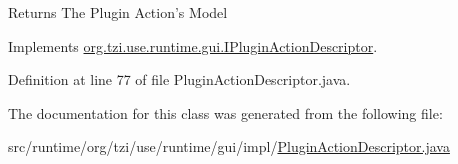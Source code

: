 \begin{DoxyReturn}{Returns}
The Plugin Action's Model 
\end{DoxyReturn}


Implements \hyperlink{interfaceorg_1_1tzi_1_1use_1_1runtime_1_1gui_1_1_i_plugin_action_descriptor_a44045feb006ff19ce6f61a0dc5e8f6e3}{org.\-tzi.\-use.\-runtime.\-gui.\-I\-Plugin\-Action\-Descriptor}.



Definition at line 77 of file Plugin\-Action\-Descriptor.\-java.



The documentation for this class was generated from the following file\-:\begin{DoxyCompactItemize}
\item 
src/runtime/org/tzi/use/runtime/gui/impl/\hyperlink{_plugin_action_descriptor_8java}{Plugin\-Action\-Descriptor.\-java}\end{DoxyCompactItemize}
